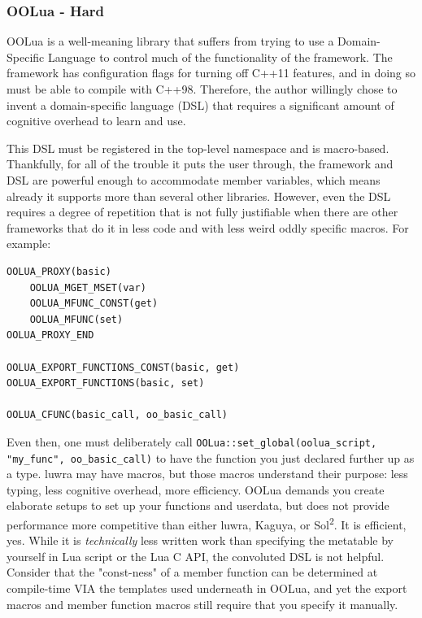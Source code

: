 \documentclass[conference,compsoc]{IEEEtran}
\newcommand{\soltwo}{Sol\textsuperscript{2}}
\begin{document}
\subsubsection{OOLua - Hard}

OOLua\cite{oolua} is a well-meaning library that suffers from trying to use a Domain-Specific Language to control much of the functionality of the framework. The framework has configuration flags for turning off C++11 features, and in doing so must be able to compile with C++98. Therefore, the author willingly chose to invent a domain-specific language (DSL) that requires a significant amount of cognitive overhead to learn and use.

This DSL must be registered in the top-level namespace and is macro-based. Thankfully, for all of the trouble it puts the user through, the framework and DSL are powerful enough to accommodate member variables, which means already it supports more than several other libraries. However, even the DSL requires a degree of repetition that is not fully justifiable when there are other frameworks that do it in less code and with less weird oddly specific macros. For example:

\begin{lstlisting}[caption={Macros to setup usertype bindings and a function binding in OOLua}, label={lst:oolua-dsl}]
OOLUA_PROXY(basic)
	OOLUA_MGET_MSET(var)
	OOLUA_MFUNC_CONST(get)
	OOLUA_MFUNC(set)
OOLUA_PROXY_END

OOLUA_EXPORT_FUNCTIONS_CONST(basic, get)
OOLUA_EXPORT_FUNCTIONS(basic, set)

OOLUA_CFUNC(basic_call, oo_basic_call)
\end{lstlisting}

Even then, one must deliberately call \lstinline|OOLua::set_global(oolua_script, "my_func", oo_basic_call)| to have the function you just declared further up as a type. luwra may have macros, but those macros understand their purpose: less typing, less cognitive overhead, more efficiency. OOLua demands you create elaborate setups to set up your functions and userdata, but does not provide performance more competitive than either luwra, Kaguya, or \soltwo{}. It is efficient, yes. While it is \emph{technically} less written work than specifying the metatable by yourself in Lua script or the Lua C API, the convoluted DSL is not helpful. Consider that the "const-ness" of a member function can be determined at compile-time VIA the templates used underneath in OOLua, and yet the export macros and member function macros still require that you specify it manually.
\end{document}
